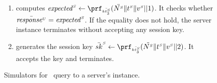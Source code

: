 \begin{figure}[H]
\begin{center}
\begin{tcolorbox}[enhanced,width=4.7in, left=0.1cm,
    drop fuzzy shadow southwest,
    colframe=black,colback=white]
{{\begin{itemize}[leftmargin=.4cm]
\begin{enumerate}
 \item computes $\VS{\mathit{expected}} \gets \prf_{\sss\bar{\VS{\keyt_{\sss3}}}}(\ddot{\VS{\nonce}}  \| \VS{\trans} \| \VS{\verifier}|| 1)$. It checks whether  $ \bar{\mathit{response}^{\scriptscriptstyle U}}=\mathit{expected}^{\scriptscriptstyle S}$. If the equality does not hold, the server instance terminates without accepting any session key. 
  \item generates the session key $\bar {sk}^{\sss S} \gets \prf_{\sss\bar{\VS{\keyt_{\sss3}}}}(\ddot{\VS{\nonce}}  \| \VS{\trans} \| \VS{\verifier}|| 2)$. 
It accepts the key and terminates.
%
  \end{enumerate}
 \end{itemize} 
}}
\end{tcolorbox}
\end{center}
\caption{Simulators for \send\ query to  a server's instance.} 
\label{fig::Send-sim-to-server}
\end{figure}


